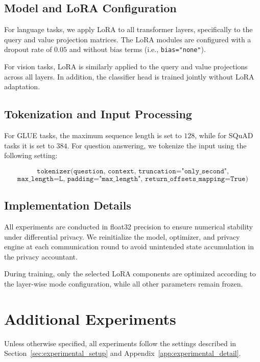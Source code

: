 \subsection{Model and LoRA Configuration}

For language tasks, we apply LoRA to all transformer layers, specifically to the query and value projection matrices. 
The LoRA modules are configured with a dropout rate of $0.05$ and without bias terms (i.e., \texttt{bias="none"}).

For vision tasks, LoRA is similarly applied to the query and value projections across all layers. 
In addition, the classifier head is trained jointly without LoRA adaptation.


\subsection{Tokenization and Input Processing}

For GLUE tasks, the maximum sequence length is set to $128$, while for SQuAD tasks it is set to $384$. 
For question answering, we tokenize the input using the following setting:

\begin{equation*}
\texttt{tokenizer(question, context, truncation="only\_second",}
\end{equation*}
\begin{equation*}
\texttt{max\_length=L, padding="max\_length", return\_offsets\_mapping=True)}
\end{equation*}

\subsection{Implementation Details}

All experiments are conducted in float32 precision to ensure numerical stability under differential privacy. 
We reinitialize the model, optimizer, and privacy engine at each communication round to avoid unintended state accumulation in the privacy accountant.

During training, only the selected LoRA components are optimized according to the layer-wise mode configuration, while all other parameters remain frozen.



\section{Additional Experiments}
\label{sec:Appendix D}
Unless otherwise specified, all experiments follow the settings described in Section~\ref{sec:experimental_setup} and Appendix~\ref{app:experimental_detail}.


